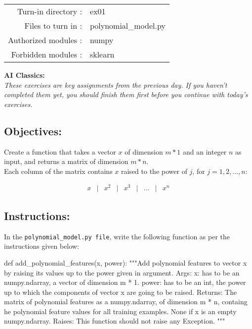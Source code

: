 \documentclass[]{article}
\newenvironment{Shaded}{\begin{snugshade}}{\end{snugshade}}
\newcommand{\CommentTok}[1]{\textcolor[rgb]{0.48,0.49,0.49}{#1}}
\newcommand{\KeywordTok}[1]{\textcolor[rgb]{0.81,0.81,0.76}{#1}}
\newcommand{\NormalTok}[1]{\textcolor[rgb]{0.81,0.81,0.76}{#1}}
\begin{document}
\begin{longtable}[]{@{}rl@{}}
\toprule
\endhead
Turn-in directory : & ex01\tabularnewline
Files to turn in : & polynomial\_model.py\tabularnewline
Authorized modules : & numpy\tabularnewline
Forbidden modules : & sklearn\tabularnewline
\bottomrule
\end{longtable}

\textbf{AI Classics:}\\
\emph{These exercises are key assignments from the previous day. If you
haven't completed them yet, you should finish them first before you
continue with today's exercises.}

\hypertarget{objectives-1}{%
\subsection{Objectives:}\label{objectives-1}}

Create a function that takes a vector \(x\) of dimension \(m * 1\) and
an integer \(n\) as input, and returns a matrix of dimension
\(m * n\).\\
Each column of the matrix contains \(x\) raised to the power of \(j\),
for \(j = 1, 2, ..., n\):

\large

\[
\begin{matrix}
x &|& x^2 &|& x^3 &|& \ldots &|& x^n
\end{matrix}
\] \normalsize

\hypertarget{instructions-1}{%
\subsection{Instructions:}\label{instructions-1}}

In the \texttt{polynomial\_model.py\ file}, write the following function
as per the instructions given below:

\begin{Shaded}
\begin{Highlighting}[]
\KeywordTok{def}\NormalTok{ add_polynomial_features(x, power):}
    \CommentTok{"""Add polynomial features to vector x by raising its values up to the power given in argument.  }
\CommentTok{    Args:}
\CommentTok{      x: has to be an numpy.ndarray, a vector of dimension m * 1.}
\CommentTok{      power: has to be an int, the power up to which the components of vector x are going to be raised.}
\CommentTok{    Returns:}
\CommentTok{      The matrix of polynomial features as a numpy.ndarray, of dimension m * n, containg he polynomial feature values for all training examples.}
\CommentTok{      None if x is an empty numpy.ndarray.}
\CommentTok{    Raises:}
\CommentTok{      This function should not raise any Exception.}
\CommentTok{    """}
\end{Highlighting}
\end{Shaded}
\end{document}
